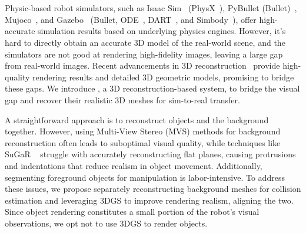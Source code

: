


\section{\our}
\label{sec: sim2real}
Physic-based robot simulators, such as Isaac Sim~\cite{isaacsim} (PhysX~\cite{physx}), PyBullet (Bullet)~\cite{pybullet}, Mujoco~\cite{todorov2012mujoco}, and Gazebo~\cite{gazebo} (Bullet, ODE~\cite{ode}, DART~\cite{lee2018dart}, and Simbody~\cite{sherman2011simbody}), offer high-accurate simulation results based on underlying physics engines. However, it's hard to directly obtain an accurate 3D model of the real-world scene, and the simulators are not good at rendering high-fidelity images, leaving a large gap from real-world images. Recent advancements in 3D reconstruction~\citep{mildenhall2021nerf,kerbl3Dgaussians,openmvs2020,yu2024gsdf,guedon2024sugar} provide high-quality rendering results and detailed 3D geometric models, promising to bridge these gaps.
We introduce \our, a 3D reconstruction-based system, to bridge the visual gap and recover their realistic 3D meshes for sim-to-real transfer.

A straightforward approach is to reconstruct objects and the background together. However, using Multi-View Stereo (MVS) methods for background reconstruction often leads to suboptimal visual quality, while techniques like SuGaR ~\citep{guedon2024sugar} struggle with accurately reconstructing flat planes, causing protrusions and indentations that reduce realism in object movement. Additionally, segmenting foreground objects for manipulation is labor-intensive. 
To address these issues, we propose separately reconstructing background meshes for collision estimation and leveraging 3DGS to improve rendering realism, aligning the two. Since object rendering constitutes a small portion of the robot's visual observations, we opt not to use 3DGS to render objects.

